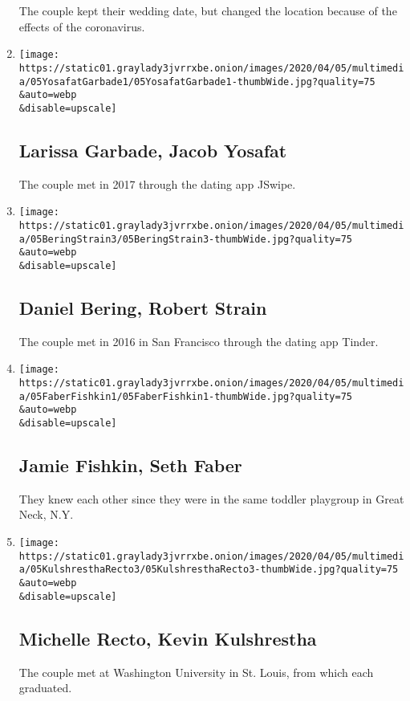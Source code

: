 \begin{enumerate}
  The couple kept their wedding date, but changed the location because
  of the effects of the coronavirus.
\item
  \href{/2020/04/05/fashion/weddings/larissa-garbade-jacob-yosafat.html}{}

  \texttt{[image: https://static01.graylady3jvrrxbe.onion/images/2020/04/05/multimedia/05YosafatGarbade1/05YosafatGarbade1-thumbWide.jpg?quality=75\\\&auto=webp\\\&disable=upscale]}

  \hypertarget{larissa-garbade-jacob-yosafat}{%
  \subsection{Larissa Garbade, Jacob
  Yosafat}\label{larissa-garbade-jacob-yosafat}}

  The couple met in 2017 through the dating app JSwipe.
\item
  \href{/2020/04/05/fashion/weddings/daniel-bering-robert-strain.html}{}

  \texttt{[image: https://static01.graylady3jvrrxbe.onion/images/2020/04/05/multimedia/05BeringStrain3/05BeringStrain3-thumbWide.jpg?quality=75\\\&auto=webp\\\&disable=upscale]}

  \hypertarget{daniel-bering-robert-strain}{%
  \subsection{Daniel Bering, Robert
  Strain}\label{daniel-bering-robert-strain}}

  The couple met in 2016 in San Francisco through the dating app Tinder.
\item
  \href{/2020/04/05/fashion/weddings/jamie-fishkin-seth-faber.html}{}

  \texttt{[image: https://static01.graylady3jvrrxbe.onion/images/2020/04/05/multimedia/05FaberFishkin1/05FaberFishkin1-thumbWide.jpg?quality=75\\\&auto=webp\\\&disable=upscale]}

  \hypertarget{jamie-fishkin-seth-faber}{%
  \subsection{Jamie Fishkin, Seth
  Faber}\label{jamie-fishkin-seth-faber}}

  They knew each other since they were in the same toddler playgroup in
  Great Neck, N.Y.
\item
  \href{/2020/04/05/fashion/weddings/michelle-recto-kevin-kulshrestha.html}{}

  \texttt{[image: https://static01.graylady3jvrrxbe.onion/images/2020/04/05/multimedia/05KulshresthaRecto3/05KulshresthaRecto3-thumbWide.jpg?quality=75\\\&auto=webp\\\&disable=upscale]}

  \hypertarget{michelle-recto-kevin-kulshrestha}{%
  \subsection{Michelle Recto, Kevin
  Kulshrestha}\label{michelle-recto-kevin-kulshrestha}}

  The couple met at Washington University in St. Louis, from which each
  graduated.
\end{enumerate}

